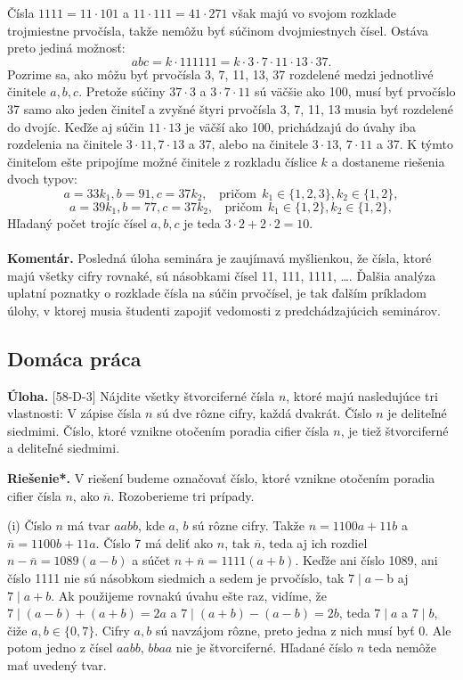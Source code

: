 \documentclass[11pt,a4paper,oneside,final]{book}
\newcommand{\kom}{\textbf{Komentár.} }
\newcommand{\ul}{\textbf{Úloha.} }
\newcommand{\rieh}{\textbf{Riešenie*.} }
\begin{document}
Čísla $1 111 = 11\cdot 101$ a $11\cdot 111 = 41\cdot 271$ však majú vo svojom rozklade trojmiestne prvočísla, takže nemôžu byť súčinom dvojmiestnych čísel. Ostáva preto jediná možnosť:
$$ abc = k \cdot 111 111 = k \cdot 3 \cdot 7 \cdot 11 \cdot 13 \cdot 37.$$
Pozrime sa, ako môžu byť prvočísla 3, 7, 11, 13, 37 rozdelené medzi jednotlivé činitele $a, b, c$. Pretože súčiny $37 \cdot 3$ a $3 \cdot 7 \cdot 11$ sú väčšie ako 100, musí byť prvočíslo 37 samo ako jeden činiteľ a zvyšné štyri prvočísla 3, 7, 11, 13 musia byť rozdelené do dvojíc. Keďže aj súčin $11 \cdot 13$ je väčší ako 100, prichádzajú do úvahy iba rozdelenia na činitele $3 \cdot 11, 7 \cdot 13$ a 37, alebo na činitele $3 \cdot 13$, $7 \cdot 11$ a 37. K týmto činiteľom ešte pripojíme možné činitele z rozkladu číslice $k$ a dostaneme riešenia dvoch typov:
$$a = 33k_1, b = 91, c = 37k_2, \ \ \ \ \text {pričom} \ \ k_1 \in \{1, 2, 3\}, k_2 \in \{1, 2\},$$
$$a = 39k_1, b = 77, c = 37k_2,\ \ \ \ \text{pričom}\ \ k_1 \in \{1, 2\}, k_2 \in \{1, 2\},$$
Hľadaný počet trojíc čísel $a, b, c$ je teda $3 \cdot 2 + 2 \cdot 2 = 10$.\\
\\
\kom Posledná úloha seminára je zaujímavá myšlienkou, že čísla, ktoré majú všetky cifry rovnaké, sú násobkami čísel 11, 111, 1111, \ldots. Ďalšia analýza uplatní poznatky o rozklade čísla na súčin prvočísel, je tak ďalším príkladom úlohy, v ktorej musia študenti zapojiť vedomosti z predchádzajúcich seminárov.


\subsection*{Domáca práca}
\begin{tcolorbox}[breakable,notitle,boxrule=0pt,colback=light-gray,colframe=light-gray]\ul [58-D-3] Nájdite všetky štvorciferné čísla $n$, ktoré majú nasledujúce tri vlastnosti: V zápise čísla $n$ sú dve rôzne cifry, každá dvakrát. Číslo $n$ je deliteľné siedmimi. Číslo, ktoré vznikne otočením poradia cifier čísla $n$, je tiež štvorciferné a deliteľné siedmimi.

\end{tcolorbox}

\rieh V riešení budeme označovať číslo, ktoré vznikne otočením poradia cifier čísla $n$, ako $\overline{n}$. Rozoberieme tri prípady.

(i) Číslo $n$ má tvar $aabb$, kde $a$, $b$ sú rôzne cifry. Takže $n = 1100a + 11b$ a $\overline{n} = 1100b + 11a$. Číslo 7 má deliť ako $n$, tak $\overline{n}$, teda aj ich rozdiel $n - \overline{n} = 1089(a - b)$ a súčet $n + \overline{n} = 1111(a + b)$. Keďže ani číslo 1089, ani číslo 1111 nie sú násobkom siedmich a sedem je prvočíslo, tak $7 \mid a - $b aj $7 \mid a + b$. Ak použijeme rovnakú úvahu ešte raz, vidíme, že $7 \mid (a - b) + (a + b) = 2a$ a $7 \mid (a + b) - (a - b) = 2b$, teda $7 \mid a$ a $7 \mid b$, čiže $a, b \in \{0, 7\}$. Cifry $a, b$ sú navzájom rôzne, preto jedna z nich musí byť 0. Ale potom jedno z čísel $aabb$, $bbaa$ nie je štvorciferné. Hľadané číslo $n$ teda nemôže mať uvedený tvar.
\end{document}
